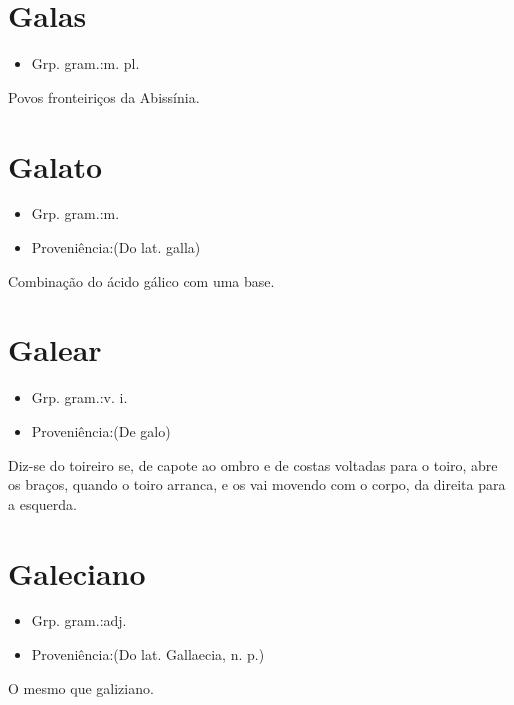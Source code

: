 \section{Galas}
\begin{itemize}
\item {Grp. gram.:m. pl.}
\end{itemize}
Povos fronteiriços da Abissínia.
\section{Galato}
\begin{itemize}
\item {Grp. gram.:m.}
\end{itemize}
\begin{itemize}
\item {Proveniência:(Do lat. \textunderscore galla\textunderscore )}
\end{itemize}
Combinação do ácido gálico com uma base.
\section{Galear}
\begin{itemize}
\item {Grp. gram.:v. i.}
\end{itemize}
\begin{itemize}
\item {Proveniência:(De \textunderscore galo\textunderscore )}
\end{itemize}
Diz-se do toireiro se, de capote ao ombro e de costas voltadas para o toiro, abre os braços, quando o toiro arranca, e os vai movendo com o corpo, da direita para a esquerda.
\section{Galeciano}
\begin{itemize}
\item {Grp. gram.:adj.}
\end{itemize}
\begin{itemize}
\item {Proveniência:(Do lat. \textunderscore Gallaecia\textunderscore , n. p.)}
\end{itemize}
O mesmo que \textunderscore galiziano\textunderscore .
